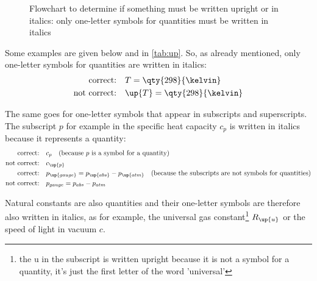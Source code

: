 \begin{frame}{}
\begin{figure}
        \caption{Flowchart to determine if something must be written upright or in italics: only one-letter symbols for quantities must be written in italics}\label{fig:italics}
    \end{figure}
\end{frame}

Some examples are given below and in \cref{tab:up}. So, as already mentioned, only one-letter symbols for quantities are written in italics:
\begin{align*}
    \text{correct:} \quad & T = \qty{298}{\kelvin} \\
    \text{not correct:} \quad & \up{T} = \qty{298}{\kelvin}
\end{align*}

The same goes for one-letter symbols that appear in subscripts and superscripts. The subscript $p$ for example in the specific heat capacity $c_{p}$ is written in italics because it represents a quantity:
\begin{align*}
    \text{correct:} \quad & c_{p} \quad \text{(because $p$ is a symbol for a quantity)} \\
    \text{not correct:} \quad & c_\up{p} \\
    \text{correct:} \quad & p_\up{gauge} = p_\up{abs} - p_\up{atm}\quad \text{(because the subscripts are not symbols for quantities)} \\
    \text{not correct:} \quad & p_{gauge} = p_{abs} - p_{atm}
\end{align*}

Natural constants are also quantities and their one-letter symbols are therefore also written in italics, as for example, the universal gas constant\footnote{the u in the subscript is written upright because it is not a symbol for a quantity, it's just the first letter of the word 'universal'} $R_\up{u}$ or the speed of light in vacuum $c$. 

